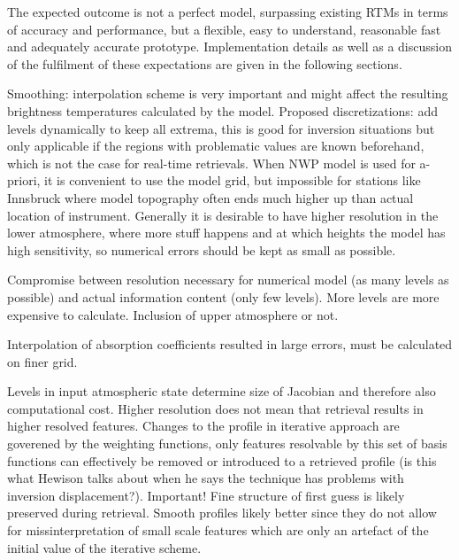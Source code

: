         The expected outcome is not a perfect model, surpassing existing RTMs in
        terms of accuracy and performance, but a flexible, easy to understand,
        reasonable fast and adequately accurate prototype. Implementation
        details as well as a discussion of the fulfilment of these expectations
        are given in the following sections.

    \stopsubsection

    \startsubsection[title=Discretization and Interpolation]

        Smoothing: interpolation scheme is very important and might affect the
        resulting brightness temperatures calculated by the model. Proposed
        discretizations: add levels dynamically to keep all extrema, this is
        good for inversion situations but only applicable if the regions with
        problematic values are known beforehand, which is not the case for
        real-time retrievals. When NWP model is used for a-priori, it is
        convenient to use the model grid, but impossible for stations like
        Innsbruck where model topography often ends much higher up than
        actual location of instrument. Generally it is desirable to have higher
        resolution in the lower atmosphere, where more stuff happens and
        at which heights the model has high sensitivity, so numerical errors
        should be kept as small as possible.

        Compromise between resolution necessary for numerical model (as many
        levels as possible) and actual information content (only few levels).
        More levels are more expensive to calculate. Inclusion of upper
        atmosphere or not.

        Interpolation of absorption coefficients resulted in large errors,
        must be calculated on finer grid.

        Levels in input atmospheric state determine size of Jacobian and
        therefore also computational cost. Higher resolution does not mean
        that retrieval results in higher resolved features. Changes to the
        profile in iterative approach are goverened by the weighting functions,
        only features resolvable by this set of basis functions can effectively
        be removed or introduced to a retrieved profile (is this what Hewison
        talks about when he says the technique has problems with inversion
        displacement?). Important! Fine structure of first guess is likely
        preserved during retrieval. Smooth profiles likely better since they
        do not allow for missinterpretation of small scale features which are
        only an artefact of the initial value of the iterative scheme.

